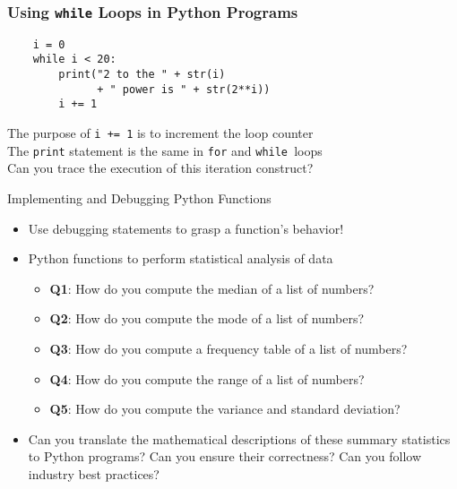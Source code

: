 \documentclass[14pt,aspectratio=169]{beamer}
\begin{document}
%
\begin{frame}[fragile]
  \frametitle{Using {\tt while} Loops in Python Programs}
  \normalsize
  \hspace*{-.65in}
  \begin{minipage}{6in}
    \vspace*{.25in}
    \begin{verbatim}
    i = 0
    while i < 20:
        print("2 to the " + str(i)
              + " power is " + str(2**i))
        i += 1
    \end{verbatim}
  \end{minipage}
  \vspace*{.1in}
  \begin{center}
    \normalsize \noindent The purpose of {\tt i += 1} is to increment the loop counter\\
    \normalsize \noindent The {\tt print} statement is the same in {\tt for} and
    {\tt while }loops\\
    \normalsize \noindent Can you trace the execution of this iteration
    construct?\\
  \end{center}
\end{frame}

%
\begin{frame}{Implementing and Debugging Python Functions}
  \begin{itemize}
    \item Use debugging statements to grasp a function's behavior!
      \vspace*{-.15in}
    \item Python functions to perform statistical analysis of data
      \begin{itemize}
        \item {\bf Q1}: How do you compute the median of a list of numbers?
        \item {\bf Q2}: How do you compute the mode of a list of numbers?
        \item {\bf Q3}: How do you compute a frequency table of a list of
          numbers?
        \item {\bf Q4}: How do you compute the range of a list of numbers?
        \item {\bf Q5}: How do you compute the variance and standard deviation?
      \end{itemize}
      \vspace*{-.2in}
    \item Can you translate the mathematical descriptions of these summary
      statistics to Python programs? Can you ensure their correctness? Can you
      follow industry best practices?
  \end{itemize}
\end{frame}
\end{document}
